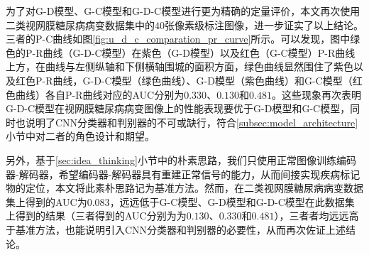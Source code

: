 为了对G-D模型、G-C模型和G-D-C模型进行更为精确的定量评价，本文再次使用二类视网膜糖尿病病变数据集中的$40$张像素级标注图像，进一步证实了以上结论。三者的P-C曲线如图\ref{fig:u_d_c_comparation_pr_curve}所示。可以发现，图中绿色的P-R曲线（G-D-C模型）在紫色（G-D模型）以及红色（G-C模型）P-R曲线上方，在曲线与左侧纵轴和下侧横轴围城的面积方面，绿色曲线显然围住了紫色以及红色P-R曲线，G-D-C模型（绿色曲线）、G-D模型（紫色曲线）和G-C模型（红色曲线）各自P-R曲线对应的AUC分别为$0.330$、$0.130$和$0.481$。这些现象再次表明G-D-C模型在视网膜糖尿病病变图像上的性能表现要优于G-D模型和G-C模型，同时也说明了CNN分类器和判别器的不可或缺行，符合\ref{subsec:model_architecture}小节中对二者的角色设计和期望。

另外，基于\ref{sec:idea_thinking}小节中的朴素思路，我们只使用正常图像训练编码器-解码器，希望编码器-解码器具有重建正常信号的能力，从而间接实现疾病标记物的定位，本文将此素朴思路记为基准方法。然而，在二类视网膜糖尿病病变数据集上得到的AUC为$0.083$，远远低于G-C模型、G-D模型和G-D-C模型在此数据集上得到的结果（三者得到的AUC分别为为$0.130$、$0.330$和$0.481$），三者者均远远高于基准方法，也能说明引入CNN分类器和判别器的必要性，从而再次佐证上述结论。

